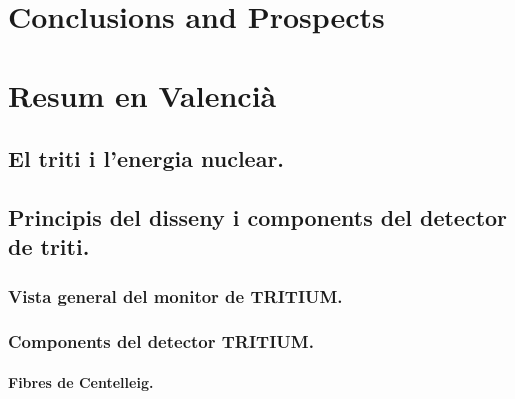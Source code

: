 \documentclass[12pt,a4paper]{book}
\begin{document}
\chapter{Conclusions and Prospects}  \label{chap:Conclusions}

\newpage

%

\chapter{Resum en Valencià}\label{chap:ValSummary}
	
\section{El triti i l'energia nuclear.}\label{sec:EnergiaNuclear}
	 

\section{Principis del disseny i components del detector de triti.}\label{subsec:PrincipisDiseny}
					
	\subsection{Vista general del monitor de TRITIUM.}\label{subsec:VistaGeneralDetector}
		 
	
	\subsection{Components del detector TRITIUM.}\label{subsec:ComponentsMonitor}
		 
		
			\subsubsection{Fibres de Centelleig.}\label{subsec:Fibres}
			 
			
\end{document}
